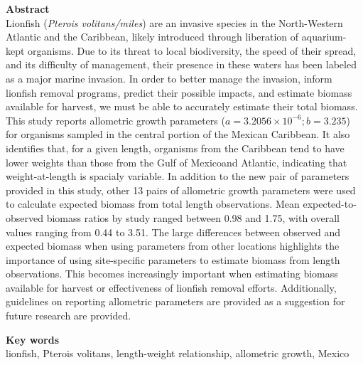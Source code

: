 \documentclass[12pt,]{article}
\begin{document}
\textbf{Abstract}\\
Lionfish (\emph{Pterois volitans/miles}) are an invasive species in the
North-Western Atlantic and the Caribbean, likely introduced through
liberation of aquarium-kept organisms. Due to its threat to local
biodiversity, the speed of their spread, and its difficulty of
management, their presence in these waters has been labeled as a major
marine invasion. In order to better manage the invasion, inform lionfish
removal programs, predict their possible impacts, and estimate biomass
available for harvest, we must be able to accurately estimate their
total biomass. This study reports allometric growth parameters
(\(a = 3.2056\times 10^{-6}; b = 3.235\)) for organisms sampled in the
central portion of the Mexican Caribbean. It also identifies that, for a
given length, organisms from the Caribbean tend to have lower weights
than those from the Gulf of Mexicoand Atlantic, indicating that
weight-at-length is spacialy variable. In addition to the new pair of
parameters provided in this study, other 13 pairs of allometric growth
parameters were used to calculate expected biomass from total length
observations. Mean expected-to-observed biomass ratios by study ranged
between 0.98 and 1.75, with overall values ranging from 0.44 to 3.51.
The large differences between observed and expected biomass when using
parameters from other locations highlights the importance of using
site-specific parameters to estimate biomass from length observations.
This becomes increasingly important when estimating biomass available
for harvest or effectiveness of lionfish removal efforts. Additionally,
guidelines on reporting allometric parameters are provided as a
suggestion for future research are provided.

\textbf{Key words}\\
lionfish, Pterois volitans, length-weight relationship, allometric
growth, Mexico
\end{document}
